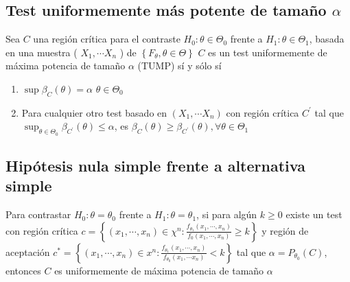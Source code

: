 \subsection{Test uniformemente más potente de tamaño $\alpha$}


\begin{proposición}
Sea $C$ una región crítica para el contraste $H_{0}: \theta \in \Theta_{0}$ frente a $H_{1}: \theta \in \Theta_{1}$, basada en una muestra ( $X_{1}, \cdots X_{n}$ ) de $\left\{F_{\theta}, \theta \in \Theta\right\}$ $C$ es un test uniformemente de máxima potencia de tamaño $\alpha$ (TUMP) sí y sólo sí
\begin{enumerate}
\item $\sup \beta_{C}(\theta)=\alpha$ $\theta \in \Theta_{0}$
\item Para cualquier otro test basado en $\left(X_{1}, \cdots X_{n}\right)$ con región crítica $C^{\prime}$ tal que $\sup _{\theta \in \Theta_{0}} \beta_{C^{\prime}}(\theta) \leq \alpha$, es $\beta_{C}(\theta) \geq \beta_{C^{\prime}}(\theta), \forall \theta \in \Theta_{1}$
\end{enumerate}
\end{proposición}

\subsection{Hipótesis nula simple frente a alternativa simple}

\begin{teorema}  
Para contrastar $H_{0}: \theta=\theta_{0}$ frente a $H_{1}: \theta=\theta_{1}$, si para algún $k \geq 0$ existe un test con región crítica $c=\left\{\left(x_{1}, \cdots, x_{n}\right) \in \chi^{n}: \frac{f_{\theta_{1}}\left(x_{1}, \cdots, x_{n}\right)}{f_{0}\left(x_{1}, \cdots, x_{n}\right)} \geq k\right\}$ y región de aceptación $c^{*}=\left\{\left(x_{1}, \cdots, x_{n}\right) \in x^{n}: \frac{f_{\theta_{1}}\left(x_{1}, \cdots, x_{n}\right)}{f_{\theta_{0}}\left(x_{1}, \cdots x_{n}\right)}<k\right\}$ tal que $\alpha=P_{\theta_{0}}(C)$, entonces $C$ es uniformemente de máxima potencia de tamaño $\alpha$
\end{teorema}

